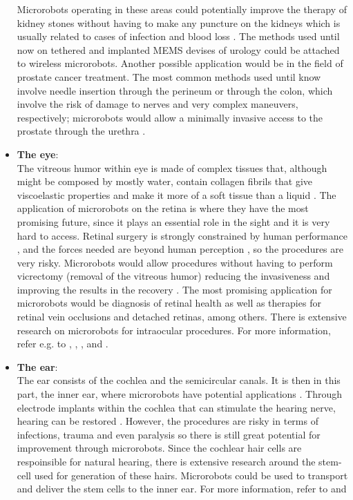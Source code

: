 \begin{itemize}
Microrobots operating in these areas could potentially improve the therapy of kidney stones without having to make any puncture on the kidneys which is usually related to cases of infection and blood loss \cite{Renner1999}. The methods used until now on tethered and implanted MEMS devises of urology \cite{Kristo2003} could be attached to wireless microrobots. Another possible application would be in the field of prostate cancer treatment. The most common methods used until know involve needle insertion through the perineum or through the colon, which involve the risk of damage to nerves and very complex maneuvers, respectively; microrobots would allow a minimally invasive access to the prostate through the urethra \cite{Nelson2010}. 
\item \textbf{The eye}: \\ The vitreous humor within eye is made of complex tissues that, although might be composed by mostly water, contain collagen fibrils that give viscoelastic properties and make it more of a soft tissue than a liquid \cite{Nelson2010}. The application of microrobots on the retina is where they have the most promising future, since it plays an essential role in the sight and it is very hard to access. Retinal surgery is strongly constrained by human performance \cite{Jagtap2004}, \cite{Balicki2010} and the forces needed are beyond human perception \cite{Gupta1999}, \cite{Iordachita2009} so the procedures are very risky. Microrobots would allow procedures without having to perform vicrectomy (removal of the vitreous humor) reducing the invasiveness and improving the results in the recovery \cite{Nelson2010}. The most promising application for microrobots would be diagnosis of retinal health as well as therapies for retinal vein occlusions and detached retinas, among others. There is extensive research on microrobots for intraocular procedures. For more information, refer e.g. to \cite{Yesin2006}, \cite{Ergeneman2008}, \cite{Ergeneman2008a}, \cite{Dogangil2008} and \cite{holligan2003}.
\item \textbf{The ear}:\\
The ear consists of the cochlea and the semicircular canals. It is then in this part, the inner ear, where microrobots have potential applications \cite{Nelson2010}. Through electrode implants within the cochlea that can stimulate the hearing nerve, hearing can be restored \cite{Cosetti2010}. However, the procedures are risky in terms of infections, trauma and even paralysis \cite{Stratigouleas2006} so there is still great potential for improvement through microrobots. Since the cochlear hair cells are respoinsible for natural hearing, there is extensive research around the stem-cell used for generation of these hairs. Microrobots could be used to transport and deliver the stem cells to the inner ear. For more information, refer to \cite{Parker2004} and \cite{Gunewardene2012}

\end{itemize}
